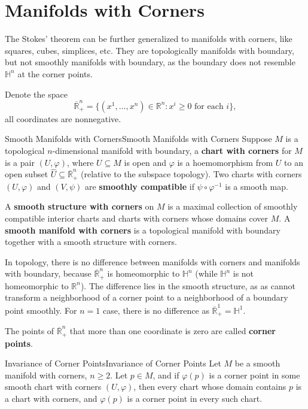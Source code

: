 \documentclass[../main.tex]{subfiles}
\begin{document}
\section{Manifolds with Corners}
The Stokes' theorem can be further generalized to manifolds with corners, like squares, cubes, simplices, etc. They are topologically manifolds with boundary, but not smoothly manifolds with boundary, as the boundary does not resemble $\mathbb{H}^n$ at the corner points.

Denote the space
\begin{equation*}
  \overline{\mathbb{R}}_+^n = \{(x^1, \ldots , x^n) \in \mathbb{R}^n : x^i \geq 0 \text{ for each } i\},
\end{equation*}
all coordinates are nonnegative.

\begin{definition}{Smooth Manifolds with Corners}{Smooth Manifolds with Corners}
  Suppose $M$ is a topological $n$-dimensional manifold with boundary, a \textbf{chart with corners} for $M$ is a pair $(U,\varphi)$, where $U \subseteq M$ is open and $\varphi$ is a hoemomorphism from $U$ to an open subset $\hat{U} \subseteq \overline{\mathbb{R}}_+^n$ (relative to the subspace topology). Two charts with corners $(U,\varphi)$ and $(V,\psi)$ are \textbf{smoothly compatible} if $\psi \circ \varphi^{-1}$ is a smooth map.

  A \textbf{smooth structure with corners} on $M$ is a maximal collection of smoothly compatible interior charts and charts with corners whose domains cover $M$. A \textbf{smooth manifold with corners} is a topological manifold with boundary together with a smooth structure with corners.
\end{definition}

In topology, there is no difference between manifolds with corners and manifolds with boundary, because $\overline{\mathbb{R}}_+^n$ is homeomorphic to $\mathbb{H}^n$ (while $\mathbb{H}^n$ is not homeomorphic to $\mathbb{R}^n$). The difference lies in the smooth structure, as as cannot transform a neighborhood of a corner point to a neighborhood of a boundary point smoothly. For $n=1$ case, there is no difference as $\overline{\mathbb{R}}_+^1 = \mathbb{H}^1$.

The points of $\overline{\mathbb{R}}_+^n$ that more than one coordinate is zero are called \textbf{corner points}.

\begin{proposition}{Invariance of Corner Points}{Invariance of Corner Points}
  Let $M$ be a smooth manifold with corners, $n\geq 2$. Let $p\in M$, and if $\varphi(p)$ is a corner point in some smooth chart with corners $(U,\varphi)$, then every chart whose domain contains $p$ is a chart with corners, and $\varphi(p)$ is a corner point in every such chart.
\end{proposition}
\end{document}
